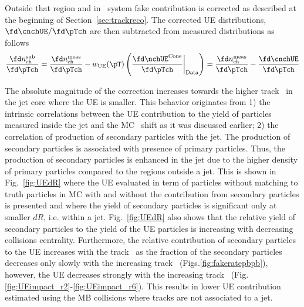 Outside that region and in \pp\ system fake contribution is corrected as described at the beginning of Section~\ref{sec:trackreco}.  The corrected UE distributions, $\fd \cnchUE / \fd \pTch$ are then subtracted from measured distributions as follows
 \begin{eqnarray}
\frac{\fd n_{\mathrm{ch}}^{\mathrm{sub}}}{\fd \pTch}  = \frac{\fd n_{\mathrm{ch}}^{\mathrm{meas}}}{\fd \pTch} - {w_{\mathrm{UE}} (\pT)} \left( \frac{\fd \nchUE^{\mathrm{Cone}}}{\fd \pTch} \bigg|_{\mathrm{Data}} \right)  = \frac{\fd n_{\mathrm{ch}}^{\mathrm{meas}}}{\fd \pTch} - \frac{\fd \cnchUE}{\fd \pTch}
 \end{eqnarray}

The absolute magnitude of the correction increases towards the higher track \pt\ in the jet core where the UE is smaller. This behavior originates from 1) the intrinsic correlations between the UE contribution to the yield of particles measured inside the jet and the MC \pTjet\ shift as it was discussed earlier; 2) the correlation of production of secondary particles with the jet.  The production of secondary particles is associated with presence of primary particles. Thus, the production of secondary particles is enhanced in the jet due to the higher density of primary particles compared to the regions outside a jet. This is shown in Fig.~\ref{fig:UEdR} where the UE evaluated in term of particles without matching to truth particles in MC with and without the contribution from secondary particles is presented and where the yield of secondary particles is significant only at smaller $dR$, i.e. within a jet.  Fig.~\ref{fig:UEdR} also shows that the relative yield of secondary particles to the yield of the UE particles is increasing with decreasing collisions centrality. Furthermore, the relative contribution of secondary particles to the UE increases with the track \pT\ as the fraction of the secondary particles decreases only slowly with the increasing track \pT\ (Figs.\ref{fig:fakeratepbpb}), however, the UE decreases strongly with the increasing track \pT\ (Fig.\ref{fig:UEimpact_r2}-\ref{fig:UEimpact_r6}). This results in lower UE contribution estimated using the MB collisions where tracks are not associated to a jet.

     

